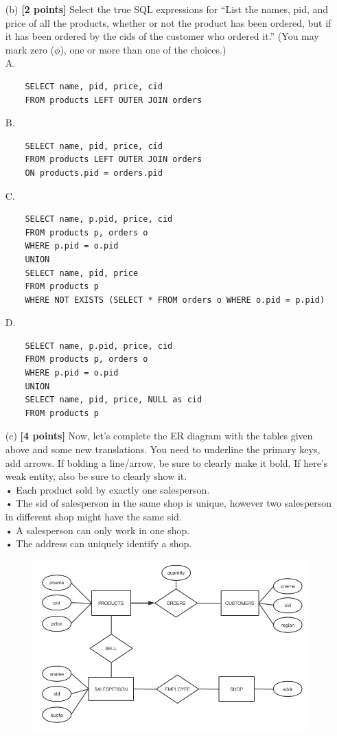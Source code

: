 \documentclass[10pt]{article}
\begin{document}
\begin{enumerate}
\begin{itemize}
		      \item[(b)] \textbf{[2 points]} Select the true SQL expressions for “List the names, pid, and price of all the products, whether or not the product has been ordered,
		            but if it has been ordered by the cids of the customer who ordered it.”
		            (You may mark zero ($\phi$), one or more than one of the choices.)\\
		            A. \begin{lstlisting}
	SELECT name, pid, price, cid
	FROM products LEFT OUTER JOIN orders
\end{lstlisting}
		            B. \begin{lstlisting}
	SELECT name, pid, price, cid 
	FROM products LEFT OUTER JOIN orders
	ON products.pid = orders.pid
\end{lstlisting}
		            C. \begin{lstlisting}
	SELECT name, p.pid, price, cid
	FROM products p, orders o
	WHERE p.pid = o.pid
	UNION
	SELECT name, pid, price
	FROM products p
	WHERE NOT EXISTS (SELECT * FROM orders o WHERE o.pid = p.pid)
\end{lstlisting}
		            D. \begin{lstlisting}
	SELECT name, p.pid, price, cid
	FROM products p, orders o
	WHERE p.pid = o.pid
	UNION
	SELECT name, pid, price, NULL as cid
	FROM products p
\end{lstlisting}

		      \item[(c)] \textbf{[4 points]}
		            Now, let's complete the ER diagram with the tables given above and some new translations.
		            You need to underline the primary keys, add arrows. If bolding a line/arrow,
		            be sure to clearly make it bold. If here's weak entity, also be sure to clearly show it.\\
		            •	Each product sold by exactly one salesperson.\\
		            •	The sid of salesperson in the same shop is unique, however two salesperson in different shop might have the same sid.\\
		            •	A salesperson can only work in one shop.\\
		            •	The address can uniquely identify a shop.\\
		            \begin{figure}[ht]
			            \centering
			            \includegraphics[width=0.7\linewidth]{E_R}
		            \end{figure}
	      \end{itemize}
\end{enumerate}
\end{document}
